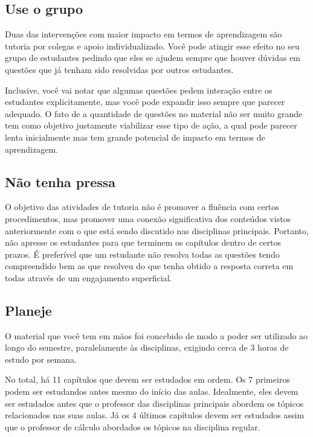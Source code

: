 \subsection{Use o grupo}

Duas das intervenções com maior impacto em termos de aprendizagem são tutoria por colegas e apoio individualizado. Você pode atingir esse efeito no seu grupo de estudantes pedindo que eles se ajudem sempre que houver dúvidas em questões que já tenham sido resolvidas por outros estudantes.

Inclusive, você vai notar que algumas questões pedem interação entre os estudantes explicitamente, mas você pode expandir isso sempre que parecer adequado. O fato de a quantidade de questões no material não ser muito grande tem como objetivo justamente viabilizar esse tipo de ação, a qual pode parecer lenta inicialmente mas tem grande potencial de impacto em termos de aprendizagem.

\subsection{Não tenha pressa}

O objetivo das atividades de tutoria não é promover a fluência com certos procedimentos, mas promover uma conexão significativa dos conteúdos vistos anteriormente com o que está sendo discutido nas disciplinas principais. Portanto, não apresse os estudantes para que terminem os capítulos dentro de certos prazos. É preferível que um estudante não resolva todas as questões tendo compreendido bem as que resolveu do que tenha obtido a resposta correta em todas através de um engajamento superficial.

\subsection{Planeje}

O material que você tem em mãos foi concebido de modo a poder ser utilizado ao longo do semestre, paralelamente às disciplinas, exigindo cerca de 3 horas de estudo por semana.

No total, há 11 capítulos que devem ser estudados em ordem. Os 7 primeiros podem ser estudandos antes mesmo do início das aulas. Idealmente, eles devem ser estudados antes que o professor das disciplinas principais abordem os tópicos relacionados nas suas aulas. Já os 4 últimos capítulos devem ser estudados assim que o professor de cálculo abordados os tópicos na disciplina regular.

